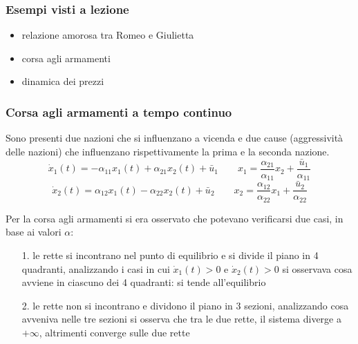 \subsubsection*{Esempi visti a lezione}
\begin{itemize}
	\item relazione amorosa tra Romeo e Giulietta
	\item corsa agli armamenti
	\item dinamica dei prezzi
\end{itemize}

\subsubsection*{Corsa agli armamenti a tempo continuo}
Sono presenti due nazioni che si influenzano a vicenda e due cause (aggressività delle nazioni) che influenzano rispettivamente
la prima e la seconda nazione.
\[\dot{x}_1(t) = -\alpha_{11} x_1(t) + \alpha_{21} x_2(t) + \bar{u}_1 \qquad x_1 = \frac{\alpha_{21}}{\alpha_{11}} x_2 + \frac{\bar{u}_1}{\alpha_{11}}\]
\[\dot{x}_2(t) = \alpha_{12} x_1(t) - \alpha_{22} x_2(t) + \bar{u}_2 \qquad x_2 = \frac{\alpha_{12}}{\alpha_{22}} x_1 + \frac{\bar{u}_2}{\alpha_{22}}\]

Per la corsa agli armamenti si era osservato che potevano verificarsi due casi, in base ai valori \(\alpha\):
\begin{itemize}
	\item[1.] le rette si incontrano nel punto di equilibrio e si divide il piano in 4 quadranti, analizzando i casi in cui \(\dot{x}_1(t) > 0\) e \(\dot{x}_2(t) > 0\)
	si osservava cosa avviene in ciascuno dei 4 quadranti: si tende all'equilibrio
	\item[2.] le rette non si incontrano e dividono il piano in 3 sezioni, analizzando cosa avveniva nelle tre sezioni si osserva che
	tra le due rette, il sistema diverge a \(+\infty\), altrimenti converge sulle due rette
\end{itemize}

